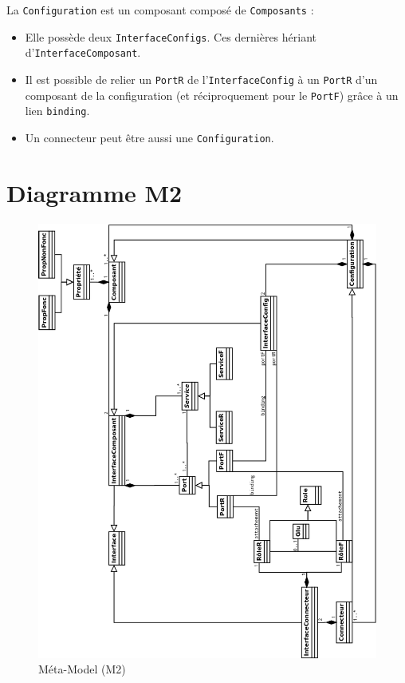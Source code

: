 La \verb+Configuration+  est un composant composé de \verb+Composants+ : 

\begin{itemize}
\item 
  Elle possède deux \verb+InterfaceConfigs+. Ces dernières hériant d'\verb+InterfaceComposant+.
\item
  Il est possible de relier un \verb+PortR+ de l'\verb+InterfaceConfig+ à un \verb+PortR+ d'un composant de la configuration (et réciproquement pour le \verb+PortF+) grâce à un lien \verb+binding+.
\item
  Un connecteur peut être aussi une \verb+Configuration+.
\end{itemize}

\section{Diagramme M2}
\pagestyle{empty}
\begin{figure}[htb]
  \includegraphics[scale=0.36]{img/M2}
  \caption{Méta-Model (M2)}
  \label{fig:M2}
\end{figure}
